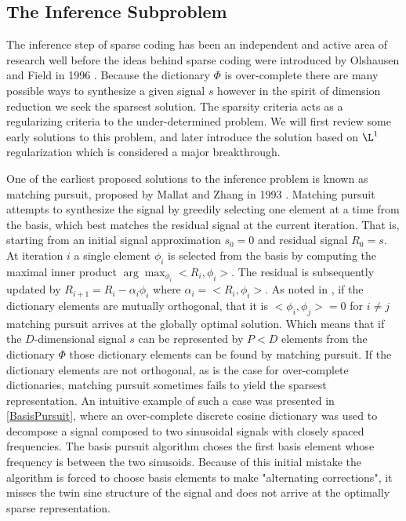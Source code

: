 \documentclass[12pt,a4paper]{article}
\begin{document}
\subsection{The Inference Subproblem} 
The inference step of sparse coding has been an independent and active area of research well before the ideas behind sparse coding were introduced by Olshausen and Field in 1996 \cite{Sparse Coding}. Because the dictionary $\Phi$ is over-complete there are many possible ways to synthesize a given signal $s$ however in the spirit of dimension reduction we seek the sparsest solution. The sparsity criteria acts as a regularizing criteria to the under-determined problem. We will first review some early solutions to this problem, and later introduce the solution based on $\L^1$ regularization which is considered a major breakthrough.

One of the earliest proposed solutions to the inference problem is known as matching pursuit, proposed by Mallat and Zhang in 1993 \cite{25 in BP}. Matching pursuit attempts to synthesize the signal by greedily selecting one element at a time from the basis, which best matches the residual signal at the current iteration. That is, starting from an initial signal approximation $s_0 = 0$ and residual signal $R_0 = s$. At iteration $i$ a single element $\phi_i$ is selected from the basis by computing the maximal inner product $\arg\max_{\phi_i} < R_i, \phi_i>$. The residual is subsequently updated by $R_{i+1} = R_i - \alpha_i \phi_i$ where $\alpha_i = < R_i, \phi_i>$. As noted in \cite{BasisPursuit}, if the dictionary elements are mutually orthogonal, that it is $<\phi_i,\phi_j> = 0$ for $i \neq j$ matching pursuit arrives at the globally optimal solution. Which means that if the $D$-dimensional signal $s$ can be represented by $P<D$ elements from the dictionary $\Phi$ those dictionary elements can be found by matching pursuit. If the dictionary elements are not orthogonal, as is the case for over-complete dictionaries, matching pursuit sometimes fails to yield the sparsest representation. An intuitive example of such a case was presented in \ref{BasisPursuit}, where an over-complete discrete cosine dictionary was used to decompose a signal composed to two sinusoidal signals with closely spaced frequencies. The basis pursuit algorithm choses the first basis element whose frequency is between the two sinusoids. Because of this initial mistake the algorithm is forced to choose basis elements to make "alternating corrections", it misses the twin sine structure of the signal and does not arrive at the optimally sparse representation.
\end{document}
